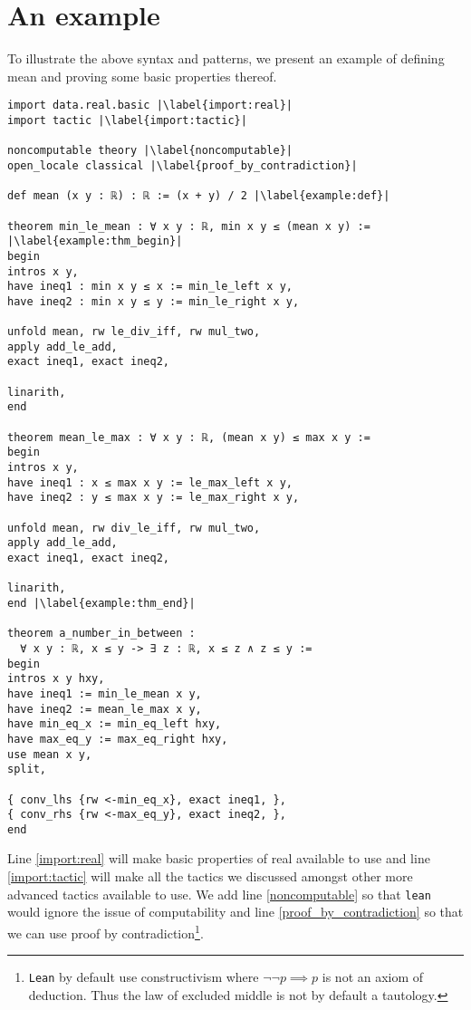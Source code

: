 \documentclass{report}
\theoremstyle{definition}
\theoremstyle{plain}
\begin{document}
\section{An example}
To illustrate the above syntax and patterns, we present an example of defining mean and proving some basic properties thereof.

\begin{verbatim}
import data.real.basic |\label{import:real}|
import tactic |\label{import:tactic}|
  
noncomputable theory |\label{noncomputable}|
open_locale classical |\label{proof_by_contradiction}|  

def mean (x y : ℝ) : ℝ := (x + y) / 2 |\label{example:def}|
  
theorem min_le_mean : ∀ x y : ℝ, min x y ≤ (mean x y) := |\label{example:thm_begin}|
begin
intros x y,
have ineq1 : min x y ≤ x := min_le_left x y,
have ineq2 : min x y ≤ y := min_le_right x y,
    
unfold mean, rw le_div_iff, rw mul_two, 
apply add_le_add, 
exact ineq1, exact ineq2, 
  
linarith,
end
  
theorem mean_le_max : ∀ x y : ℝ, (mean x y) ≤ max x y :=
begin
intros x y,
have ineq1 : x ≤ max x y := le_max_left x y,
have ineq2 : y ≤ max x y := le_max_right x y,
  
unfold mean, rw div_le_iff, rw mul_two,
apply add_le_add,
exact ineq1, exact ineq2,
  
linarith,
end |\label{example:thm_end}|
  
theorem a_number_in_between : 
  ∀ x y : ℝ, x ≤ y -> ∃ z : ℝ, x ≤ z ∧ z ≤ y :=
begin
intros x y hxy,
have ineq1 := min_le_mean x y,
have ineq2 := mean_le_max x y,
have min_eq_x := min_eq_left hxy,
have max_eq_y := max_eq_right hxy,
use mean x y,
split,
  
{ conv_lhs {rw <-min_eq_x}, exact ineq1, },
{ conv_rhs {rw <-max_eq_y}, exact ineq2, },
end

\end{verbatim}

Line \ref{import:real} will make basic properties of real available to use and line \ref{import:tactic} will make all the tactics we discussed amongst other more advanced tactics available to use. We add line \ref{noncomputable} so that {\tt lean} would ignore the issue of computability and line \ref{proof_by_contradiction} so that we can use proof by contradiction\footnote{{\tt Lean} by default use constructivism where $\neg\neg p\implies p$ is not an axiom of deduction. Thus the law of excluded middle is not by default a tautology.}. 
\end{document}
